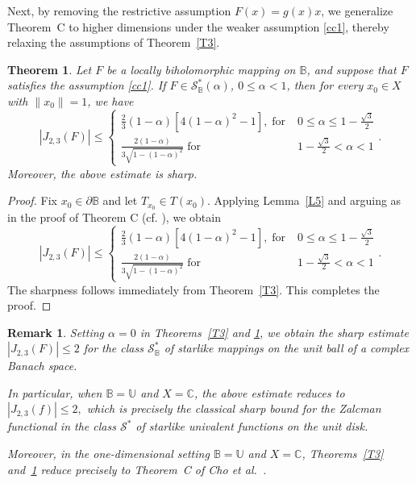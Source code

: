 \documentclass[11pt, reqno]{amsart}
\newtheorem{theo}{Theorem}[section]
\newtheorem{rem}{Remark}[section]
\numberwithin{equation}{section}
\begin{document}
\medskip
Next, by removing the restrictive assumption $F(x)=g(x)x$, we generalize Theorem~C to higher dimensions under the weaker assumption \eqref{cc1}, thereby relaxing the assumptions of Theorem~\ref{T3}.
\begin{theo}\label{T3.1}
Let $F$ be a locally biholomorphic mapping on $\mathbb{B}$, and suppose that $F$ satisfies the assumption \eqref{cc1}. If $F\in\mathcal{S}^*_\mathbb{B}(\alpha)$, $0\leq \alpha <1$, then for every $x_0\in X$ with $\|x_0\|=1$, we have
\[
|J_{2,3}(F)| \leq \begin{cases} \frac{2}{3}(1-\alpha)[4(1-\alpha)^2-1], \;\text{for}\; & 0\leq \alpha\leq  1-\frac{\sqrt 3}{2}\\
         \frac{2(1-\alpha)}{3\sqrt{1-(1-\alpha)^2}} \;\text{for}\; &  1-\frac{\sqrt 3}{2}<\alpha <1
\end{cases}.\]
  Moreover, the above estimate is sharp.
\end{theo}
\begin{proof} Fix $x_0\in \partial\mathbb{B}$ and let $T_{x_0}\in T(x_0)$. Applying Lemma~\ref{L5} and arguing as in the proof of Theorem C (cf. \cite[Theorem~2.1]{CKKLS2018}), we obtain
\[
|J_{2,3}(F)| \leq \begin{cases} \frac{2}{3}(1-\alpha)[4(1-\alpha)^2-1], \;\text{for}\; & 0\leq \alpha\leq  1-\frac{\sqrt 3}{2}\\
         \frac{2(1-\alpha)}{3\sqrt{1-(1-\alpha)^2}} \;\text{for}\; &  1-\frac{\sqrt 3}{2}<\alpha <1
\end{cases}.\]
The sharpness follows immediately from Theorem~\ref{T3}. This completes the proof.\end{proof}
\begin{rem}
Setting $\alpha=0$ in Theorems~\ref{T3} and \ref{T3.1}, we obtain the sharp estimate $|J_{2,3}(F)|\leq 2$
 for the class $\mathcal{S}_{\mathbb{B}}^{*}$ of starlike mappings on the unit ball of a complex Banach space.
 
 In particular, when $\mathbb{B}=\mathbb{U}$ and $X=\mathbb{C}$, the above estimate reduces to
$|J_{2,3}(f)|\leq 2,$
which is precisely the classical sharp bound for the Zalcman functional in the class $\mathcal{S}^{*}$ of starlike univalent functions on the unit disk.

 
Moreover, in the one-dimensional setting $\mathbb{B}=\mathbb{U}$ and $X=\mathbb{C}$, Theorems~\ref{T3} and~\ref{T3.1} reduce precisely to Theorem~C of Cho \emph{et al.}~\cite[Theorem~2.1]{CKKLS2018}.


\end{rem}
\end{document}
